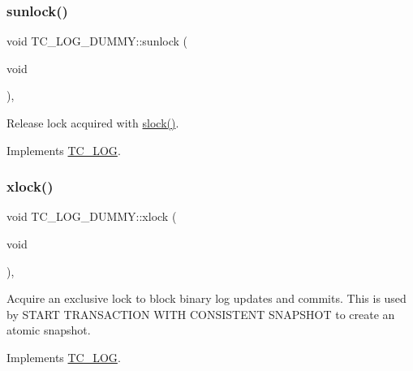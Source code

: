 \subsubsection{\texorpdfstring{sunlock()}{sunlock()}}
{\footnotesize\ttfamily void T\+C\+\_\+\+L\+O\+G\+\_\+\+D\+U\+M\+M\+Y\+::sunlock (\begin{DoxyParamCaption}\item[{void}]{ }\end{DoxyParamCaption})\hspace{0.3cm}{\ttfamily [inline]}, {\ttfamily [virtual]}}

Release lock acquired with \mbox{\hyperlink{classTC__LOG__DUMMY_a144eb01c40fb75ae3a1c04609dc89ea3}{slock()}}. 

Implements \mbox{\hyperlink{classTC__LOG_ab383cdb4b722c9b11d284ac8b970b087}{T\+C\+\_\+\+L\+OG}}.

\mbox{\label{classTC__LOG__DUMMY_a48cd538ebda31693671772018d2563b9}} 
\subsubsection{\texorpdfstring{xlock()}{xlock()}}
{\footnotesize\ttfamily void T\+C\+\_\+\+L\+O\+G\+\_\+\+D\+U\+M\+M\+Y\+::xlock (\begin{DoxyParamCaption}\item[{void}]{ }\end{DoxyParamCaption})\hspace{0.3cm}{\ttfamily [inline]}, {\ttfamily [virtual]}}

Acquire an exclusive lock to block binary log updates and commits. This is used by S\+T\+A\+RT T\+R\+A\+N\+S\+A\+C\+T\+I\+ON W\+I\+TH C\+O\+N\+S\+I\+S\+T\+E\+NT S\+N\+A\+P\+S\+H\+OT to create an atomic snapshot. 

Implements \mbox{\hyperlink{classTC__LOG_aac75dc061e9aae27449e675b23c27ae3}{T\+C\+\_\+\+L\+OG}}.

\mbox{\label{classTC__LOG__DUMMY_a0ac9df53eb4f1ec401e0bdf9d9c95f62}} 
